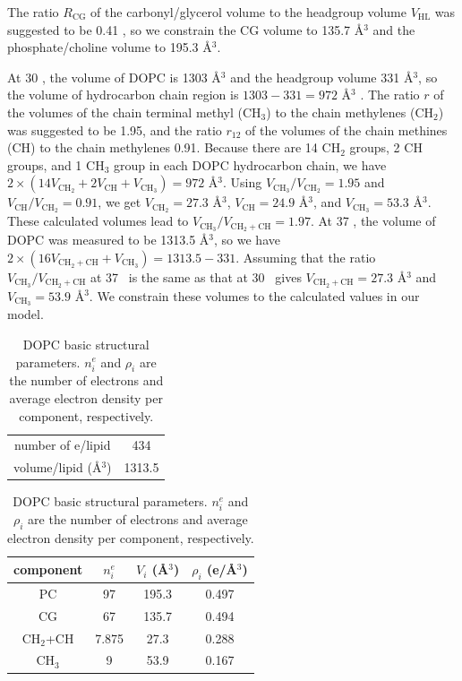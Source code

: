 \documentclass[12pt,letterpaper]{article}
\newcommand{\VHL}{V_\textrm{HL}}
\newcommand{\VCHtwoCH}{V_{\textrm{CH}_2+\textrm{CH}}}
\newcommand{\VCHthree}{V_{\textrm{CH}_3}}
\newcommand{\VCHtwo}{V_{\textrm{CH}_2}}
\newcommand{\VCH}{V_\textrm{CH}}
\newcommand{\RCG}{R_\textrm{CG}}
\begin{document}
The ratio $\RCG$ of 
the carbonyl/glycerol volume to the headgroup volume $\VHL$ was
suggested to be 0.41 \cite{ref:Braun13}, so we constrain the CG
volume to 135.7 \AA$^3$ and the phosphate/choline volume to 
195.3 \AA$^3$. 

At 30 \textcelsius, the volume of DOPC is 1303 \AA$^3$ and the headgroup
volume 331 \AA$^3$, so the volume of hydrocarbon chain region is 
$1303 - 331 = 972$ \AA$^3$ \cite{ref:Braun13}. The ratio $r$ of the volumes
of the chain terminal methyl (CH$_3$) to the chain methylenes (CH$_2$) was 
suggested to be 1.95, and the ratio $r_{12}$ of the volumes of the chain
methines (CH) to the chain methylenes 0.91. Because there are 14 CH$_2$ groups,
2 CH groups, and 1 CH$_3$ group in each DOPC hydrocarbon chain, we have
$2\times(14\VCHtwo+2\VCH+\VCHthree)=972$ \AA$^3$. 
Using $\VCHthree/\VCHtwo=1.95$ 
and $\VCH/\VCHtwo=0.91$, we get $\VCHtwo=27.3$ \AA$^3$, 
$\VCH=24.9$ \AA$^3$, and $\VCHthree=53.3$ \AA$^3$. These calculated volumes
lead to $\VCHthree/\VCHtwoCH=1.97$. 
At 37 \textcelsius, the volume of DOPC was measured to be 1313.5 \AA$^3$, so
we have $2\times(16\VCHtwoCH+\VCHthree)=1313.5-331$. Assuming that the ratio 
$\VCHthree/\VCHtwoCH$ at 37 \textcelsius\ is the same as that at 30 \textcelsius\ 
gives $\VCHtwoCH=27.3$ \AA$^3$ and $\VCHthree=53.9$ \AA$^3$. We constrain
these volumes to the calculated values in our model.
\begin{table}[htbp]
  \centering
  \begin{tabular}{ cc }
  \hline
    number of e/lipid & 434 \\ 
    volume/lipid (\AA$^3$) & 1313.5 \\
  \hline
  \end{tabular}
  \quad
  \begin{tabular}{ cccc }
    \hline
    component & $n^e_i$ & $V_i$ (\AA$^3$) & $\rho_i$ (e/\AA$^3$) \\
    \hline 
    PC & 97 & 195.3 & 0.497 \\  
    CG & 67 & 135.7 & 0.494 \\  
    CH$_2$+CH & 7.875 & 27.3 & 0.288 \\
    CH$_3$ & 9 & 53.9 & 0.167 \\
    \hline
  \end{tabular}
  \caption{DOPC basic structural parameters. $n^e_i$ and $\rho_i$ are
  the number of electrons and average electron density per component, 
  respectively.}
  \label{tb:DOPC_basic_params}
\end{table}
\end{document}
